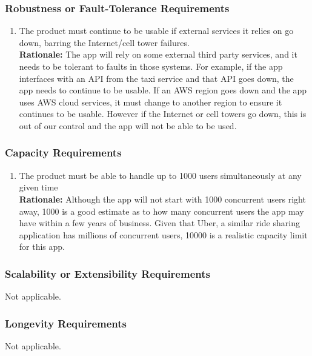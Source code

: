 \documentclass[]{article}
\begin{document}
\subsubsection{Robustness or Fault-Tolerance Requirements}
\label{ssub:robustness_or_fault_tolerance_requirements}
\begin{enumerate}[{PR-RFT}1. ]
	\item The product must continue to be usable if external services it relies on go down, barring the Internet/cell tower failures.\\
	{\bf Rationale:} The app will rely on some external third party services, and it needs to be tolerant to faults in those systems. For example, if the app interfaces with an API from the taxi service and that API goes down, the app needs to continue to be usable. If an AWS region goes down and the app uses AWS cloud services, it must change to another region to ensure it continues to be usable. However if the Internet or cell towers go down, this is out of our control and the app will not be able to be used.
\end{enumerate}

\subsubsection{Capacity Requirements}
\label{ssub:capacity_requirements}
\begin{enumerate}[{PR-C}1. ]
	\item The product must be able to handle up to 1000 users simultaneously at any given time \\
	{\bf Rationale:} Although the app will not start with 1000 concurrent users right away, 1000 is a good estimate as to how many concurrent users the app may have within a few years of business. Given that Uber, a similar ride sharing application has millions of concurrent users, 10000 is a realistic capacity limit for this app.
\end{enumerate}

\subsubsection{Scalability or Extensibility Requirements}
\label{ssub:scalability_or_extensibility_requirements}
    Not applicable.

\subsubsection{Longevity Requirements}
\label{ssub:longevity_requirements}
	Not applicable.
\end{document}
